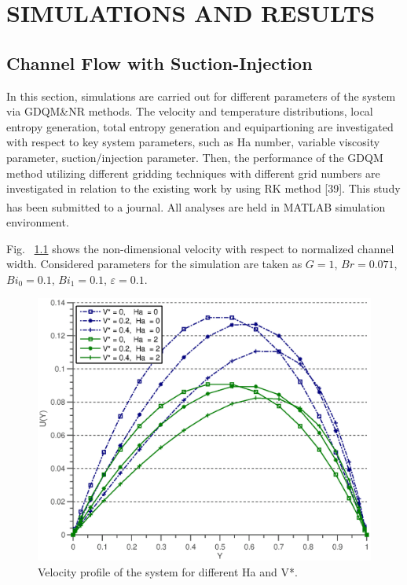 \chapter{SIMULATIONS AND RESULTS}\label{ch:ifnecch4}
\section{Channel Flow with Suction-Injection}

In this section, simulations are carried out for different parameters of the system via GDQM\&NR methods. The velocity and temperature distributions, local entropy generation, total entropy generation and equipartioning are investigated with respect to key system parameters, such as Ha number, variable viscosity parameter, suction/injection parameter. Then, the performance of the GDQM method utilizing different gridding techniques with different grid numbers are investigated in relation to the existing work by using RK method [39]. This study has been submitted to a journal. All analyses are held in MATLAB\textsuperscript{\textregistered} simulation environment. 

Fig. ~\ref{fig:2} shows the non-dimensional velocity with respect to normalized channel width. Considered parameters for the simulation are taken as $G = 1$, $Br = 0.071$, $B{{i}_{0}}=0.1$, $B{{i}_{1}}=0.1$, $\varepsilon =0.1$.

\begin{figure}
 \centering
  \includegraphics[scale=0.8]{figures/fig2.eps}
\vspace*{6mm}
\caption{Velocity profile of the system for different Ha and V*.}
\label{fig:2}       %
\end{figure}

